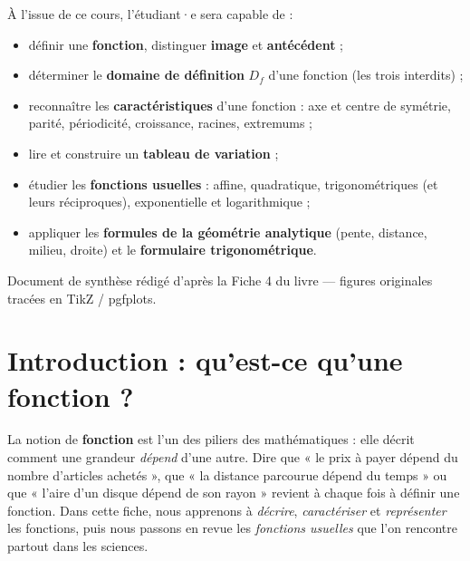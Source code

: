 \documentclass[11pt,a4paper]{article}
\newcommand{\Df}{D_f}
\begin{document}
\begin{tcolorbox}[boxbase,colback=primary!5,colframe=primary,width=15.5cm,
    title={\textsc{Objectifs pédagogiques de la fiche}}]
À l'issue de ce cours, l'étudiant·e sera capable de :
\begin{itemize}[leftmargin=1.6em,topsep=2pt,itemsep=1pt]
  \item définir une \textbf{fonction}, distinguer \textbf{image} et \textbf{antécédent} ;
  \item déterminer le \textbf{domaine de définition} $\Df$ d'une fonction (les trois interdits) ;
  \item reconnaître les \textbf{caractéristiques} d'une fonction : axe et centre de symétrie, parité, périodicité, croissance, racines, extremums ;
  \item lire et construire un \textbf{tableau de variation} ;
  \item étudier les \textbf{fonctions usuelles} : affine, quadratique, trigonométriques (et leurs réciproques), exponentielle et logarithmique ;
  \item appliquer les \textbf{formules de la géométrie analytique} (pente, distance, milieu, droite) et le \textbf{formulaire trigonométrique}.
\end{itemize}
\end{tcolorbox}

\vspace{0.4cm}
{\small\color{black!60} Document de synthèse rédigé d'après la Fiche 4 du livre — figures originales tracées en TikZ / pgfplots.}
\par
\endgroup

\newpage
\renewcommand{\contentsname}{\textcolor{primarydark}{Table des matières}}
\tableofcontents
\thispagestyle{fancy}
\newpage

\section{Introduction : qu'est-ce qu'une fonction ?}
La notion de \textbf{fonction} est l'un des piliers des mathématiques : elle décrit
comment une grandeur \emph{dépend} d'une autre. Dire que « le prix à payer dépend
du nombre d'articles achetés », que « la distance parcourue dépend du temps » ou que
« l'aire d'un disque dépend de son rayon » revient à chaque fois à définir une fonction.
Dans cette fiche, nous apprenons à \emph{décrire}, \emph{caractériser} et \emph{représenter}
les fonctions, puis nous passons en revue les \emph{fonctions usuelles} que l'on rencontre
partout dans les sciences.
\end{document}
